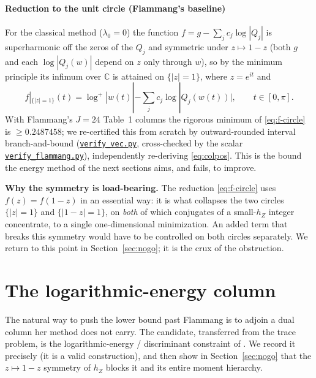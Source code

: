 \documentclass[11pt,reqno]{amsart}
\theoremstyle{plain}
\theoremstyle{definition}
\newcommand{\C}{\mathbb{C}}
\newcommand{\hZ}{h_Z}
\newcommand{\repofile}[1]{\href{https://github.com/tempcollab/optimizationproblems/blob/main/constants/82a/certificate/#1}{\texttt{#1}}}
\begin{document}
\paragraph{Reduction to the unit circle (Flammang's baseline)}
For the classical method ($\lambda_0=0$) the function $f=g-\sum_jc_j\log|Q_j|$ is
superharmonic off the zeros of the $Q_j$ and symmetric under $z\mapsto1-z$ (both $g$
and each $\log|Q_j(w)|$ depend on $z$ only through $w$), so by the minimum principle
its infimum over $\C$ is attained on $\{|z|=1\}$, where $z=e^{it}$ and
\begin{equation}\label{eq:f-circle}
  f|_{\{|z|=1\}}(t)=\log^+|w(t)|-\sum_jc_j\log|Q_j(w(t))|,\qquad t\in[0,\pi].
\end{equation}
With Flammang's $J=24$ Table~1 columns the rigorous minimum of \eqref{eq:f-circle} is
$\ge0.2487458$; we re-certified this from scratch by outward-rounded interval
branch-and-bound (\repofile{verify\_vec.py}, cross-checked by the scalar
\repofile{verify\_flammang.py}), independently re-deriving \eqref{eq:colpos}. This is
the bound the energy method of the next sections aims, and fails, to improve.

\medskip\noindent\textbf{Why the symmetry is load-bearing.} The reduction
\eqref{eq:f-circle} uses $f(z)=f(1-z)$ in an essential way: it is what collapses the
two circles $\{|z|=1\}$ and $\{|1-z|=1\}$, on \emph{both} of which conjugates of a
small-$\hZ$ integer concentrate, to a single one-dimensional minimization. An added
term that breaks this symmetry would have to be controlled on both circles
separately. We return to this point in Section~\ref{sec:nogo}; it is the crux of the
obstruction.

\section{The logarithmic-energy column}\label{sec:energy}

The natural way to push the lower bound past Flammang is to adjoin a dual column her
method does not carry. The candidate, transferred from the trace problem, is the
logarithmic-energy / discriminant constraint of \citet{OSS}. We record it precisely
(it is a valid construction), and then show in Section~\ref{sec:nogo} that the
$z\mapsto1-z$ symmetry of $\hZ$ blocks it and its entire moment hierarchy.
\end{document}
